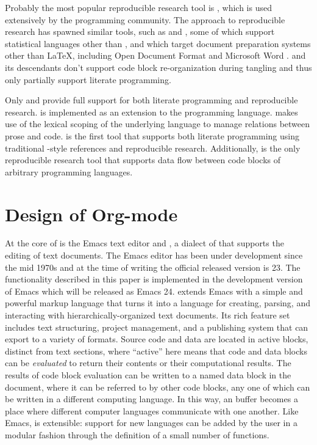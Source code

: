 \documentclass[article,shortnames]{jss}
\begin{document}
Probably the most popular reproducible research tool is , which
is used extensively by the  programming community.  The 
approach to reproducible research has spawned similar tools, such as
 and  , some of which support statistical languages other than ,
and which target document preparation systems other than \LaTeX{},
including Open Document Format and Microsoft Word
\citep{Lenth:2007:SLP,baier07:_excel,odfWeave,lenth09:_statw_users_manual}.
 and its descendants don't support code block re-organization
during tangling and thus only partially support literate programming.

Only  and  provide full support for both literate
programming and reproducible research.   is implemented as an
extension to the  programming language.   makes use of the
lexical scoping of the underlying language to manage relations between
prose and code.   is the first tool that supports both literate
programming using traditional -style references and reproducible
research.  Additionally,  is the only reproducible research
tool that supports data flow between code blocks of arbitrary
programming languages.
\section{Design of Org-mode}
\label{sec-3}
\label{design}

At the core of  is the Emacs text editor \citep{emacs} and
 \citep{lewis10:_gnu_emacs_lisp_refer_manual}, a dialect of
 that supports the editing of text documents.  The Emacs editor
has been under development since the mid 1970s and at the time of
writing the official released version is 23.  The functionality
described in this paper is implemented in the development version of
Emacs which will be released as Emacs 24.
 extends Emacs with a simple and powerful markup
language that turns it into a language for creating, parsing, and
interacting with hierarchically-organized text documents.  Its rich
feature set includes text structuring, project management, and a
publishing system that can export to a variety of formats.  Source
code and data are located in active blocks, distinct from text
sections, where ``active'' here means that code and data blocks can be
\emph{evaluated} to return their contents or their computational results.
The results of code block evaluation can be written to a named data
block in the document, where it can be referred to by other code
blocks, any one of which can be written in a different computing
language.  In this way, an  buffer becomes a place where
different computer languages communicate with one another.  Like
Emacs,  is extensible: support for new languages can be added
by the user in a modular fashion through the definition of a small
number of  functions.
\end{document}
